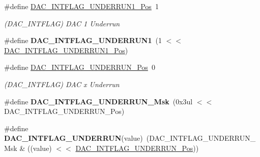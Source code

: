 \begin{DoxyCompactItemize}
\item 
\hypertarget{group___s_a_m_l21___d_a_c_gac4c87b8b90e57a6044d2954eb478dcb6}{}\#define \hyperlink{group___s_a_m_l21___d_a_c_gac4c87b8b90e57a6044d2954eb478dcb6}{D\+A\+C\+\_\+\+I\+N\+T\+F\+L\+A\+G\+\_\+\+U\+N\+D\+E\+R\+R\+U\+N1\+\_\+\+Pos}~1\label{group___s_a_m_l21___d_a_c_gac4c87b8b90e57a6044d2954eb478dcb6}

\begin{DoxyCompactList}\small\item\em (D\+A\+C\+\_\+\+I\+N\+T\+F\+L\+A\+G) D\+A\+C 1 Underrun \end{DoxyCompactList}\item 
\hypertarget{group___s_a_m_l21___d_a_c_gaa49bdfea65580cfa6eeef451b0250d91}{}\#define {\bfseries D\+A\+C\+\_\+\+I\+N\+T\+F\+L\+A\+G\+\_\+\+U\+N\+D\+E\+R\+R\+U\+N1}~(1 $<$$<$ \hyperlink{group___s_a_m_l21___d_a_c_gac4c87b8b90e57a6044d2954eb478dcb6}{D\+A\+C\+\_\+\+I\+N\+T\+F\+L\+A\+G\+\_\+\+U\+N\+D\+E\+R\+R\+U\+N1\+\_\+\+Pos})\label{group___s_a_m_l21___d_a_c_gaa49bdfea65580cfa6eeef451b0250d91}

\item 
\hypertarget{group___s_a_m_l21___d_a_c_ga6c43469c26efeb772af1a2ceba6e472b}{}\#define \hyperlink{group___s_a_m_l21___d_a_c_ga6c43469c26efeb772af1a2ceba6e472b}{D\+A\+C\+\_\+\+I\+N\+T\+F\+L\+A\+G\+\_\+\+U\+N\+D\+E\+R\+R\+U\+N\+\_\+\+Pos}~0\label{group___s_a_m_l21___d_a_c_ga6c43469c26efeb772af1a2ceba6e472b}

\begin{DoxyCompactList}\small\item\em (D\+A\+C\+\_\+\+I\+N\+T\+F\+L\+A\+G) D\+A\+C x Underrun \end{DoxyCompactList}\item 
\hypertarget{group___s_a_m_l21___d_a_c_ga07d9e8afc2c3b26a092b0e50a84cfa07}{}\#define {\bfseries D\+A\+C\+\_\+\+I\+N\+T\+F\+L\+A\+G\+\_\+\+U\+N\+D\+E\+R\+R\+U\+N\+\_\+\+Msk}~(0x3ul $<$$<$ D\+A\+C\+\_\+\+I\+N\+T\+F\+L\+A\+G\+\_\+\+U\+N\+D\+E\+R\+R\+U\+N\+\_\+\+Pos)\label{group___s_a_m_l21___d_a_c_ga07d9e8afc2c3b26a092b0e50a84cfa07}

\item 
\hypertarget{group___s_a_m_l21___d_a_c_gac29ac5e4326d07863dba7572a1eed651}{}\#define {\bfseries D\+A\+C\+\_\+\+I\+N\+T\+F\+L\+A\+G\+\_\+\+U\+N\+D\+E\+R\+R\+U\+N}(value)~(D\+A\+C\+\_\+\+I\+N\+T\+F\+L\+A\+G\+\_\+\+U\+N\+D\+E\+R\+R\+U\+N\+\_\+\+Msk \& ((value) $<$$<$ \hyperlink{group___s_a_m_l21___d_a_c_ga6c43469c26efeb772af1a2ceba6e472b}{D\+A\+C\+\_\+\+I\+N\+T\+F\+L\+A\+G\+\_\+\+U\+N\+D\+E\+R\+R\+U\+N\+\_\+\+Pos}))\label{group___s_a_m_l21___d_a_c_gac29ac5e4326d07863dba7572a1eed651}


\end{DoxyCompactItemize}
